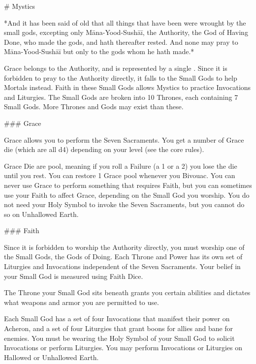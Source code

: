 


# Mystics







  
*And it has been said of old that all things that have been were wrought by the small gods, excepting only Māna-Yood-Sushāī, the Authority, the God of Having Done, who made the gods, and hath thereafter rested.  And none may pray to Māna-Yood-Sushāī but only to the gods whom he hath made.*



Grace belongs to the Authority, and is represented by a single \UD.  Since it is forbidden to pray to the Authority directly, it falls to the Small Gods to help Mortals instead.  Faith in these Small Gods allows Mystics to practice Invocations and Liturgies.
The Small Gods are broken into 10 Thrones, each containing 7 Small Gods.  More Thrones and Gods may exist than these.


### Grace

Grace allows you to perform the Seven Sacraments.  You get a number of Grace die (which are all d4) depending on your level (see the core rules).  

Grace Die are {pool}, meaning if you roll a Failure (a 1 or a 2) you lose the die until you rest.  You can restore 1 Grace {pool} whenever you Bivouac. You can never use Grace to perform something that requires Faith, but you can sometimes use your Faith to affect Grace, depending on the Small God you worship.  You do not need your Holy Symbol to invoke the Seven Sacraments, but you cannot do so on Unhallowed Earth.  

### Faith

Since it is forbidden to worship the Authority directly, you must worship one of the Small Gods, the Gods of Doing. Each Throne and Power has its own set of Liturgies and Invocations independent of the Seven Sacraments.  Your belief in your Small God is measured using Faith Dice. 

The Throne your Small God sits beneath grants you certain abilities and dictates what weapons and armor you are permitted to use. 

Each Small God has a set of four Invocations that manifest their power on Acheron, and a set of four Liturgies that grant boons for allies and bane for enemies.  You must be wearing the Holy Symbol of your Small God to solicit Invocations or perform Liturgies.  You may perform Invocations or Liturgies on Hallowed or Unhallowed Earth.

